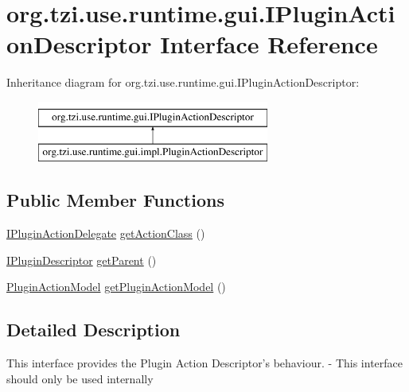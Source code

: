 \hypertarget{interfaceorg_1_1tzi_1_1use_1_1runtime_1_1gui_1_1_i_plugin_action_descriptor}{\section{org.\-tzi.\-use.\-runtime.\-gui.\-I\-Plugin\-Action\-Descriptor Interface Reference}
\label{interfaceorg_1_1tzi_1_1use_1_1runtime_1_1gui_1_1_i_plugin_action_descriptor}
}
Inheritance diagram for org.\-tzi.\-use.\-runtime.\-gui.\-I\-Plugin\-Action\-Descriptor\-:\begin{figure}[H]
\begin{center}
\leavevmode
\includegraphics[height=2.000000cm]{interfaceorg_1_1tzi_1_1use_1_1runtime_1_1gui_1_1_i_plugin_action_descriptor}
\end{center}
\end{figure}
\subsection*{Public Member Functions}
\begin{DoxyCompactItemize}
\item 
\hyperlink{interfaceorg_1_1tzi_1_1use_1_1runtime_1_1gui_1_1_i_plugin_action_delegate}{I\-Plugin\-Action\-Delegate} \hyperlink{interfaceorg_1_1tzi_1_1use_1_1runtime_1_1gui_1_1_i_plugin_action_descriptor_adafec35c5a4af616c74d38eba73833d9}{get\-Action\-Class} ()
\item 
\hyperlink{interfaceorg_1_1tzi_1_1use_1_1runtime_1_1_i_plugin_descriptor}{I\-Plugin\-Descriptor} \hyperlink{interfaceorg_1_1tzi_1_1use_1_1runtime_1_1gui_1_1_i_plugin_action_descriptor_a2e08a42573d0e1feee782c042c1e18ab}{get\-Parent} ()
\item 
\hyperlink{classorg_1_1tzi_1_1use_1_1runtime_1_1model_1_1_plugin_action_model}{Plugin\-Action\-Model} \hyperlink{interfaceorg_1_1tzi_1_1use_1_1runtime_1_1gui_1_1_i_plugin_action_descriptor_a44045feb006ff19ce6f61a0dc5e8f6e3}{get\-Plugin\-Action\-Model} ()
\end{DoxyCompactItemize}


\subsection{Detailed Description}
This interface provides the Plugin Action Descriptor's behaviour. -\/ This interface should only be used internally

